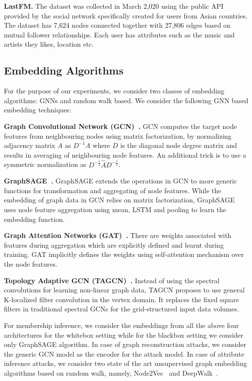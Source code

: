 \noindent\textbf{LastFM.} The dataset was collected in March 2,020 using the public API provided by the social network specifically created for users from Asian countries.
The dataset has 7,624 nodes connected together with 27,806 edges based on mutual follower relationships.
Each user has attributes such as the music and artists they likes, location etc.


\subsection{Embedding Algorithms}


\noindent For the purpose of our experiments, we consider two classes of embedding algorithms: GNNs and random walk based.
We consider the following GNN based embedding techniques:

\noindent\textbf{Graph Convolutional Network (GCN)~\cite{Kipf2016tc}.} GCN computes the target node features from neighbouring nodes using matrix factorization, by normalizing adjacency matrix $A$ as $D^{-1}A$ where $D$ is the diagonal node degree matrix and results in averaging of neighbouring node features.
An additional trick is to use a symmetric normalization as $D^{-\frac{1}{2}}\hat{A}D^{-\frac{1}{2}}$.

\noindent\textbf{GraphSAGE~\cite{NIPS20176703}.} GraphSAGE extends the operations in GCN to more generic functions for transformation and aggregating of node features.
While the embedding of graph data in GCN relies on matrix factorization, GraphSAGE uses node feature aggregation using mean, LSTM and pooling to learn the embedding function.

\noindent\textbf{Graph Attention Networks (GAT)~\cite{velickovic2018graph}.} There are weights associated with features during aggregation which are explicitly defined and learnt during training.
GAT implicitly defines the weights using self-attention mechanism over the node features.

\noindent\textbf{Topology Adaptive GCN (TAGCN)~\cite{du2018topology}.} Instead of using the spectral convolutions for learning non-linear graph data, TAGCN proposes to use general K-localized filter convolution in the vertex domain.
It replaces the fixed square filters in traditional spectral GCNs for the grid-structured input data volumes.



\noindent For membership inference, we consider the embeddings from all the above four architectures for the whitebox setting while for the blackbox setting we consider only GraphSAGE algorithm.
In case of graph reconstruction attacks, we consider the generic GCN model as the encoder for the attack model.
In case of attribute inference attacks, we consider two state of the art unsupervised graph embedding algorithms based on random walk, namely, Node2Vec~\cite{node2vec} and DeepWalk~\cite{deepwalk}.

